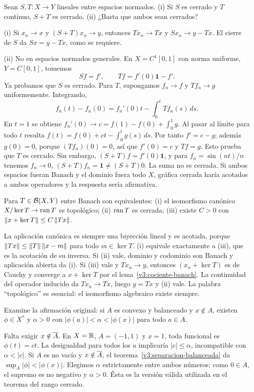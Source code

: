 \begin{ejercicio}\label{ej:v3-l03-8}
Sean $S,T:X\to Y$ lineales entre espacios normados. (i) Si $S$ es cerrado y $T$ continuo, $S+T$ es cerrado. (ii) ¿Basta que ambos sean cerrados?
\end{ejercicio}
\begin{solucion}
(i) Si $x_n\to x$ y $(S+T)x_n\to y$, entonces $Tx_n\to Tx$ y $Sx_n\to y-Tx$. El cierre de $S$ da $Sx=y-Tx$, como se requiere.

(ii) No en espacios normados generales. En $X=C^1[0,1]$ con norma uniforme, $Y=C[0,1]$, tomemos
\[Sf=f',\qquad Tf=f'(0)\boldsymbol1-f'.\]
Ya probamos que $S$ es cerrado. Para $T$, supongamos $f_n\to f$ y $Tf_n\to g$ uniformemente. Integrando,
\[f_n(t)-f_n(0)=f_n'(0)t-\int_0^t Tf_n(s)\,ds.
\]
En $t=1$ se obtiene $f_n'(0)\to c=f(1)-f(0)+\int_0^1g$. Al pasar al límite para todo $t$ resulta $f(t)=f(0)+ct-\int_0^tg(s)\,ds$. Por tanto $f'=c-g$; además $g(0)=0$, porque $(Tf_n)(0)=0$, así que $f'(0)=c$ y $Tf=g$. Esto prueba que $T$ es cerrado. Sin embargo, $(S+T)f=f'(0)\boldsymbol1$, y para $f_n=\sin(nt)/n$ tenemos $f_n\to0$, $(S+T)f_n=\boldsymbol1\not=(S+T)0$. La suma no es cerrada. Si ambos espacios fueran Banach y el dominio fuera todo $X$, gráfica cerrada haría acotados a ambos operadores y la respuesta sería afirmativa.
\end{solucion}

\begin{ejercicio}\label{ej:v3-l04-1}
Para $T\in\mathcal B(X,Y)$ entre Banach son equivalentes: (i) el isomorfismo canónico $X/\ker T\to\operatorname{ran} T$ es topológico; (ii) $\operatorname{ran} T$ es cerrada; (iii) existe $C>0$ con $\left\lVert x+\ker T\right\rVert\le C\left\lVert Tx\right\rVert$.
\end{ejercicio}
\begin{solucion}
La aplicación canónica es siempre una biyección lineal y es acotada, porque $\left\lVert Tx\right\rVert\le\left\lVert T\right\rVert\left\lVert x-m\right\rVert$ para todo $m\in\ker T$. (i) equivale exactamente a (iii), que es la acotación de su inversa. Si (ii) vale, dominio y codominio son Banach y aplicación abierta da (i). Si (iii) vale y $Tx_n\to y$, entonces $(x_n+\ker T)$ es de Cauchy y converge a $x+\ker T$ por el lema~\ref{v3:cociente-banach}. La continuidad del operador inducido da $Tx_n\to Tx$, luego $y=Tx$ y (ii) vale. La palabra ``topológico'' es esencial: el isomorfismo algebraico existe siempre.
\end{solucion}

\begin{ejercicio}\label{ej:v3-l04-2}
Examine la afirmación original: si $A$ es convexo y balanceado y $x\notin A$, existen $\phi\in X^*$ y $\alpha>0$ con $|\phi(a)|<\alpha<|\phi(x)|$ para todo $a\in A$.
\end{ejercicio}
\begin{solucion}
Falta exigir $x\notin\overline{A}$. En $X=\mathbb R$, $A=(-1,1)$ y $x=1$, toda funcional es $\phi(t)=ct$. La desigualdad para todos los $a$ implicaría $|c|\le\alpha$, incompatible con $\alpha<|c|$. Si $A$ es no vacío y $x\notin\overline{A}$, el teorema~\ref{v3:separacion-balanceada} da $\sup_A|\phi|<|\phi(x)|$. Elegimos $\alpha$ estrictamente entre ambos números; como $0\in A$, el supremo es no negativo y $\alpha>0$. Ésta es la versión válida utilizada en el teorema del rango cerrado.
\end{solucion}

